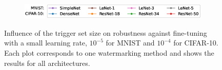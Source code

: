 \begin{figure}
    
    \begin{subfigure}{\linewidth}
    \centering
    \includegraphics[width=0.7\linewidth]{images/finetuning/legend_finetuning_per_method_colors.eps}
    \end{subfigure}
    
    \caption{Influence of the trigger set size on robustness against fine-tuning with a small learning rate, $10^{-5}$ for MNIST and  $10^{-4}$ for CIFAR-10. Each plot corresponds to one watermarking method and shows the results for all architectures.}
    \label{fig:finetuning-smalllr-permethod}
\end{figure}
